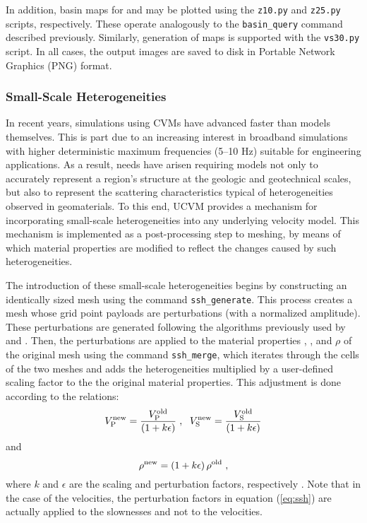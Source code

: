 In addition, basin maps for  and  may be plotted using the \texttt{z10.py} and \texttt{z25.py} scripts, respectively. These operate analogously to the \texttt{basin\_query} command described previously. Similarly, generation of \vsthirty{} maps is supported with the \texttt{vs30.py} script. In all cases, the output images are saved to disk in Portable Network Graphics (PNG) format.

\subsubsection{Small-Scale Heterogeneities}

In recent years, simulations using CVMs have advanced faster than models themselves. This is part due to an increasing interest in broadband simulations with higher deterministic maximum frequencies (5--10 Hz) suitable for engineering applications. As a result, needs have arisen requiring models not only to accurately represent a region's structure at the geologic and geotechnical scales, but also to represent the scattering characteristics typical of heterogeneities observed in geomaterials. To this end, UCVM provides a mechanism for incorporating small-scale heterogeneities into any underlying velocity model. This mechanism is implemented as a post-processing step to meshing, by means of which material properties are modified to reflect the changes caused by such heterogeneities.

The introduction of these small-scale heterogeneities begins by constructing an identically sized mesh using the command \texttt{ssh\_generate}. This process creates a mesh whose grid point payloads are perturbations (with a normalized amplitude). These perturbations are generated following the algorithms previously used by \citet{Withers_2013_SCEC} and \citet{Savran_2014_SSA}. Then, the perturbations are applied to the material properties \vp{}, \vs{}, and $\rho$ of the original mesh using the command \texttt{ssh\_merge}, which iterates through the cells of the two meshes and adds the heterogeneities multiplied by a user-defined scaling factor to the the original material properties. This adjustment is done according to the  relations:
%
\begin{equation}
\label{eq:ssh}
	V_{\mathrm{P}}^{\mathrm{new}} = \frac{ V_{\mathrm{P}}^{\mathrm{old}} }{ (1 + k \epsilon) }
	\hspace{0.3em},
	\hspace{0.6em}
	V_{\mathrm{S}}^{\mathrm{new}} = \frac{ V_{\mathrm{S}}^{\mathrm{old}} }{ (1 + k \epsilon) }
\end{equation}
%
and
%
\begin{equation}
	\rho^{\mathrm{new}} = (1 + k \epsilon) \, \rho^{\mathrm{old}}
	\hspace{0.3em},
\end{equation}
%
where $k$ and $\epsilon$ are the scaling and perturbation factors, respectively \citep[see][]{Withers_2013_SCEC, Savran_2014_SSA}. Note that in the case of the velocities, the perturbation factors in equation (\ref{eq:ssh}) are actually applied to the slownesses and not to the velocities.

